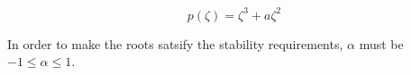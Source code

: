 \documentclass{report}
\begin{document}
\begin{enumerate}
\begin{enumerate}
\begin{enumerate}
      \[
        p(\zeta) = \zeta^3 + a\zeta^2 
      \]

      In order to make the roots satsify the stability requirements,
      $\alpha$ must be $-1 \leq \alpha \leq 1$.
    \end{enumerate}
    
  \end{enumerate}
\end{enumerate}
\end{document}
